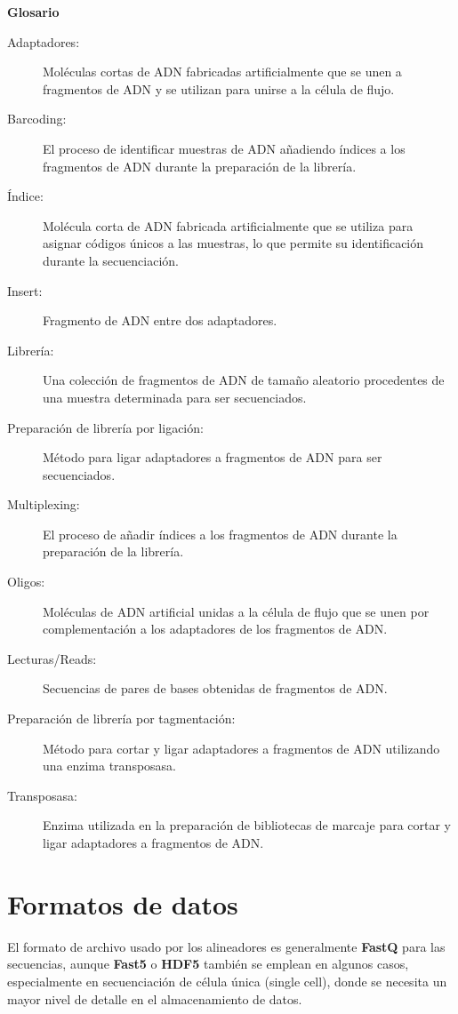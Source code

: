\begin{itemize}
\begin{table}[htbp]
\begin{mdframed}[backgroundcolor=black!10]
    \centering
\textbf{Glosario}
\begin{description}
\item[Adaptadores:] Moléculas cortas de ADN fabricadas artificialmente que se unen a fragmentos de ADN y se utilizan para unirse a la célula de flujo.
\item[Barcoding:] El proceso de identificar muestras de ADN añadiendo índices a los fragmentos de ADN durante la preparación de la librería.
\item[Índice:] Molécula corta de ADN fabricada artificialmente que se utiliza para asignar códigos únicos a las muestras, lo que permite su identificación durante la secuenciación.
\item[Insert:] Fragmento de ADN entre dos adaptadores.
\item[Librería:] Una colección de fragmentos de ADN de tamaño aleatorio procedentes de una muestra determinada para ser secuenciados.
\item[Preparación de librería por ligación:] Método para ligar adaptadores a fragmentos de ADN para ser secuenciados.
\item[Multiplexing:] El proceso de añadir índices a los fragmentos de ADN durante la preparación de la librería.
\item[Oligos:] Moléculas de ADN artificial unidas a la célula de flujo que se unen por complementación a los adaptadores de los fragmentos de ADN.
\item[Lecturas/Reads:] Secuencias de pares de bases obtenidas de fragmentos de ADN.
\item[Preparación de librería por tagmentación:] Método para cortar y ligar adaptadores a fragmentos de ADN utilizando una enzima transposasa.
\item[Transposasa:] Enzima utilizada en la preparación de bibliotecas de marcaje para cortar y ligar adaptadores a fragmentos de ADN.
\end{description}
    \end{mdframed}
\end{table}

\section{Formatos de datos}
El formato de archivo usado por los alineadores es generalmente \textbf{FastQ} para las secuencias, aunque \textbf{Fast5} o \textbf{HDF5} también se emplean en algunos casos, especialmente en secuenciación de célula única (single cell), donde se necesita un mayor nivel de detalle en el almacenamiento de datos.


\end{itemize}
